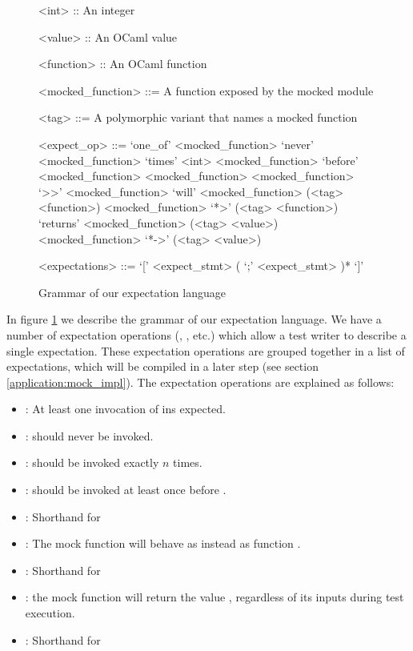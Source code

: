 \begin{figure}
  \begin{grammar}
    <int> :: An integer

    <value> :: An OCaml value

    <function> :: An OCaml function

    <mocked\_function> ::= A function exposed by the mocked module

    <tag> ::= A polymorphic variant that names a mocked function

    <expect\_op> ::=
    `one\_of' <mocked\_function>
    \alt `never' <mocked\_function>
    \alt `times' <int> <mocked\_function>
    \alt `before' <mocked\_function> <mocked\_function>
    \alt <mocked\_function> `>>' <mocked\_function>
    \alt `will' <mocked\_function> (<tag> <function>)
    \alt  <mocked\_function> `*>' (<tag> <function>)
    \alt `returns' <mocked\_function> (<tag> <value>)
    \alt <mocked\_function> `*->' (<tag> <value>)

    <expectations> ::= `[' <expect\_stmt> ( `;' <expect\_stmt> )* `]'
  \end{grammar}

  \caption{Grammar of our expectation language}
  \label{code:syntax}
\end{figure}

In figure \ref{code:syntax} we describe the grammar of our expectation
language. We have a number of expectation operations (,
, etc.) which allow a test writer to describe a single
expectation. These expectation operations are grouped together in a
list of expectations, which will be compiled in a later step (see
section \ref{application:mock_impl}). The expectation operations are
explained as follows:

\begin{itemize}
\item {}: At least one invocation of  ins
  expected.
\item {}:  should never be invoked.
\item {}:  should be invoked exactly $n$
  times.
\item {}:  should be invoked at least once
  before .
\item {}: Shorthand for 
\item {}: The mock function  will behave as
  instead as function .
\item {}: Shorthand for 
\item {}: the mock function  will return the
  value , regardless of its inputs during test execution.
\item {}: Shorthand for 
\end{itemize}

